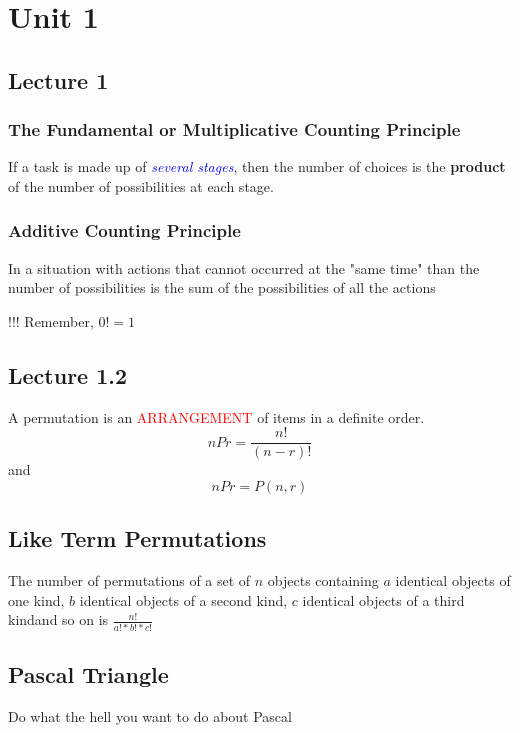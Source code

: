 \chapter{Unit 1}
\section{Lecture 1}
\subsection{The Fundamental or Multiplicative Counting Principle}
If a task is made up of \textcolor{blue}{\textit{several stages}}, then the number of choices is the \textbf{product} 
of the number of possibilities at each stage. 

\subsection{Additive Counting Principle}
In a situation with actions that cannot occurred at the "same time" than the number
of possibilities is the sum of the possibilities of all the actions

\begin{center}
    !!! Remember, $0! = 1$
\end{center}

\section{Lecture 1.2}
A permutation is an \textcolor{red}{ARRANGEMENT} of items in a definite order.
\[
    nPr = \frac{n!}{(n - r)!}
\]
and 
\[
    nPr = P(n, r)
\]

\section{Like Term Permutations}
The number of permutations of a set of $n$ objects containing $a$ identical objects of one kind, 
$b$ identical objects of a second kind, $c$ identical objects of a third kindand so on is $\frac{n!}{a! * b! * c!}$

\section{Pascal Triangle}
Do what the hell you want to do about Pascal 

